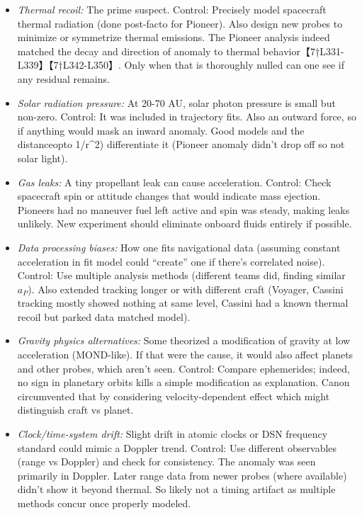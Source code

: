 \documentclass[11pt]{article}
\begin{document}
\begin{itemize}

\item 
\textit{Thermal recoil:} The prime suspect. Control: Precisely model spacecraft thermal radiation (done post-facto for Pioneer). Also design new probes to minimize or symmetrize thermal emissions. The Pioneer analysis indeed matched the decay and direction of anomaly to thermal behavior【7†L331-L339】【7†L342-L350】. Only when that is thoroughly nulled can one see if any residual remains.




\item 
\textit{Solar radiation pressure:} At 20-70 AU, solar photon pressure is small but non-zero. Control: It was included in trajectory fits. Also an outward force, so if anything would mask an inward anomaly. Good models and the distanceopto 1/r^2) differentiate it (Pioneer anomaly didn’t drop off so not solar light).




\item 
\textit{Gas leaks:} A tiny propellant leak can cause acceleration. Control: Check spacecraft spin or attitude changes that would indicate mass ejection. Pioneers had no maneuver fuel left active and spin was steady, making leaks unlikely. New experiment should eliminate onboard fluids entirely if possible.




\item 
\textit{Data processing biases:} How one fits navigational data (assuming constant acceleration in fit model could “create” one if there’s correlated noise). Control: Use multiple analysis methods (different teams did, finding similar $a_P$). Also extended tracking longer or with different craft (Voyager, Cassini tracking mostly showed nothing at same level, Cassini had a known thermal recoil but parked data matched model).




\item 
\textit{Gravity physics alternatives:} Some theorized a modification of gravity at low acceleration (MOND-like). If that were the cause, it would also affect planets and other probes, which aren’t seen. Control: Compare ephemerides; indeed, no sign in planetary orbits kills a simple modification as explanation. Canon circumvented that by considering velocity-dependent effect which might distinguish craft vs planet.




\item 
\textit{Clock/time-system drift:} Slight drift in atomic clocks or DSN frequency standard could mimic a Doppler trend. Control: Use different observables (range vs Doppler) and check for consistency. The anomaly was seen primarily in Doppler. Later range data from newer probes (where available) didn’t show it beyond thermal. So likely not a timing artifact as multiple methods concur once properly modeled.




\end{itemize}
\end{document}
